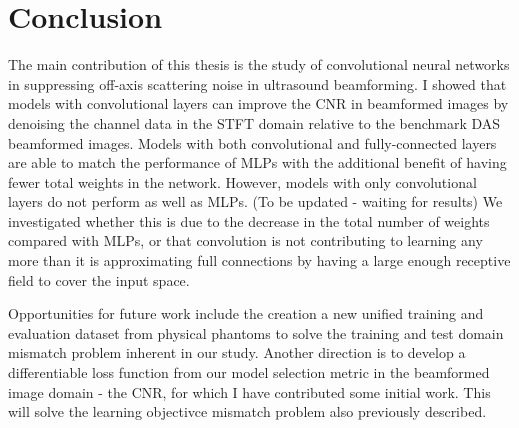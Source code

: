 \chapter{Conclusion}
The main contribution of this thesis is the study of convolutional neural networks in suppressing off-axis scattering noise in ultrasound beamforming. I showed that models with convolutional layers can improve the CNR in beamformed images by denoising the channel data in the STFT domain relative to the benchmark DAS beamformed images. Models with both convolutional and fully-connected layers are able to match the performance of MLPs with the additional benefit of having fewer total weights in the network. However, models with only convolutional layers do not perform as well as MLPs. (To be updated - waiting for results) We investigated whether this is due to the decrease in the total number of weights compared with MLPs, or that convolution is not contributing to learning any more than it is approximating full connections by having a large enough receptive field to cover the input space. %

Opportunities for future work include the creation a new unified training and evaluation dataset from physical phantoms to solve the training and test domain mismatch problem inherent in our study. Another direction is to develop a differentiable loss function from our model selection metric in the beamformed image domain - the CNR, for which I have contributed some initial work. This will solve the learning objectivce mismatch problem also previously described. 

